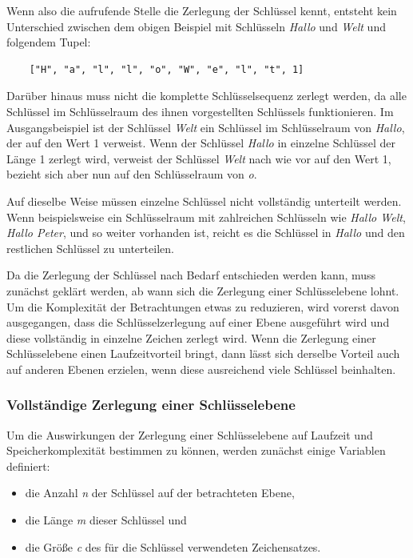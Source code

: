\documentclass[oneside]{ausarbeitung}
\begin{document}
Wenn also die aufrufende Stelle die Zerlegung der Schlüssel kennt, entsteht kein Unterschied zwischen dem obigen Beispiel mit Schlüsseln \textit{Hallo} und \textit{Welt} und folgendem Tupel:
	
\begin{lstlisting}
	["H", "a", "l", "l", "o", "W", "e", "l", "t", 1]
\end{lstlisting}
	
Darüber hinaus muss nicht die komplette Schlüsselsequenz zerlegt werden, da alle Schlüssel im Schlüsselraum des ihnen vorgestellten Schlüssels funktionieren. Im Ausgangsbeispiel ist der Schlüssel \textit{Welt} ein Schlüssel im Schlüsselraum von \textit{Hallo}, der auf den Wert 1 verweist. Wenn der Schlüssel \textit{Hallo} in einzelne Schlüssel der Länge 1 zerlegt wird, verweist der Schlüssel \textit{Welt} nach wie vor auf den Wert 1, bezieht sich aber nun auf den Schlüsselraum von \textit{o}. 
	
Auf dieselbe Weise müssen einzelne Schlüssel nicht vollständig unterteilt werden. Wenn beispielsweise ein Schlüsselraum mit zahlreichen Schlüsseln wie \textit{Hallo Welt}, \textit{Hallo Peter}, und so weiter vorhanden ist, reicht es die Schlüssel in \textit{Hallo} und den restlichen Schlüssel zu unterteilen. 
	
Da die Zerlegung der Schlüssel nach Bedarf entschieden werden kann, muss zunächst geklärt werden, ab wann sich die Zerlegung einer Schlüsselebene lohnt. Um die Komplexität der Betrachtungen etwas zu reduzieren, wird vorerst davon ausgegangen, dass die Schlüsselzerlegung auf einer Ebene ausgeführt wird und diese vollständig in einzelne Zeichen zerlegt wird. Wenn die Zerlegung einer Schlüsselebene einen Laufzeitvorteil bringt, dann lässt sich derselbe Vorteil auch auf anderen Ebenen erzielen, wenn diese ausreichend viele Schlüssel beinhalten.
	
\subsubsection{Vollständige Zerlegung einer Schlüsselebene}
	
Um die Auswirkungen der Zerlegung einer Schlüsselebene auf Laufzeit und Speicherkomplexität bestimmen zu können, werden zunächst einige Variablen definiert:
\begin{itemize}
	\item die Anzahl \textit{n} der Schlüssel auf der betrachteten Ebene,
	\item die Länge \textit{m} dieser Schlüssel und
	\item die Größe \textit{c} des für die Schlüssel verwendeten Zeichensatzes.
\end{itemize}
	
\end{document}
